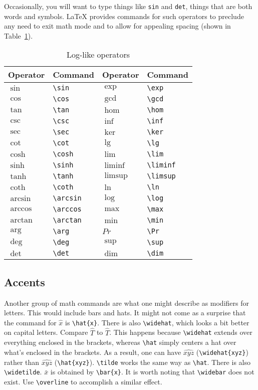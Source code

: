 Occasionally, you will want to type things like \texttt{sin} and
\texttt{det}, things that are both words and symbols.  \LaTeX{}
provides commands for such operators to preclude any need to exit math
mode and to allow for appealing spacing (shown in
Table~\ref{tab:log-operator}).
\begin{table}
  \centering
  \caption{Log-like operators}
  \label{tab:log-operator}
  \begin{tabular}{@{}llll@{}}
    \toprule
    Operator & Command & Operator & Command \\
    \midrule
    $\sin$ & \verb?\sin? & $\exp$ & \verb?\exp? \\
    $\cos$ & \verb?\cos? & $\gcd$ & \verb?\gcd? \\
    $\tan$ & \verb?\tan? & $\hom$ & \verb?\hom? \\
    $\csc$ & \verb?\csc? & $\inf$ & \verb?\inf? \\
    $\sec$ & \verb?\sec? & $\ker$ & \verb?\ker? \\
    $\cot$ & \verb?\cot? & $\lg$ & \verb?\lg? \\
    $\cosh$ & \verb?\cosh? & $\lim$ & \verb?\lim? \\
    $\sinh$ & \verb?\sinh? & $\liminf$ & \verb?\liminf? \\
    $\tanh$ & \verb?\tanh? & $\limsup$ & \verb?\limsup? \\
    $\coth$ & \verb?\coth? & $\ln$ & \verb?\ln? \\
    $\arcsin$ & \verb?\arcsin? & $\log$ & \verb?\log? \\
    $\arccos$ & \verb?\arccos? & $\max$ & \verb?\max? \\
    $\arctan$ & \verb?\arctan? & $\min$ & \verb?\min? \\
    $\arg$ & \verb?\arg? & $Pr$ & \verb?\Pr? \\
    $\deg$ & \verb?\deg? & $\sup$ & \verb?\sup? \\
    $\det$ & \verb?\det? & $\dim$ & \verb?\dim? \\
    \bottomrule
  \end{tabular}
\end{table}

\subsection{Accents}
\label{sec:accents}

Another group of math commands are what one might describe as
modifiers for letters.  This would include bars and hats.  It might
not come as a surprise that the command for $\hat{x}$ is
\verb?\hat{x}?.  There is also \verb?\widehat?, which looks a bit
better on capital letters.  Compare $\hat{T}$ to $\widehat{T}$.  This
happens because \verb?\widehat? extends over everything enclosed in
the brackets, whereas \verb?\hat?  simply centers a hat over what's
enclosed in the brackets.  As a result, one can have $\widehat{xyz}$
(\verb?\widehat{xyz}?)  rather than $\hat{xyz}$ (\verb?\hat{xyz}?).
\verb?\tilde?  works the same way as \verb?\hat?.  There is also
\verb?\widetilde?.  $\bar{x}$ is obtained by \verb?\bar{x}?.  It is
worth noting that \verb?\widebar? does not exist.  Use
\verb?\overline? to accomplish a similar effect.

